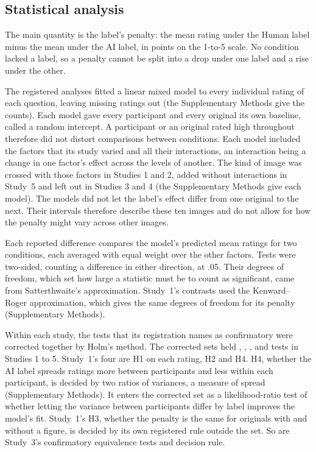 \subsection*{Statistical analysis}

The main quantity is the label's penalty: the mean rating under the Human label minus the mean under the AI label, in points on the 1-to-5 scale. No condition lacked a label, so a penalty cannot be split into a drop under one label and a rise under the other.

The registered analyses fitted a linear mixed model to every individual rating of each question, leaving missing ratings out (the Supplementary Methods give the counts). Each model gave every participant and every original its own baseline, called a random intercept. A participant or an original rated high throughout therefore did not distort comparisons between conditions. Each model included the factors that its study varied and all their interactions, an interaction being a change in one factor's effect across the levels of another. The kind of image was crossed with those factors in Studies 1 and 2, added without interactions in Study~5 and left out in Studies 3 and 4 (the Supplementary Methods give each model). The models did not let the label's effect differ from one original to the next. Their intervals therefore describe these ten images and do not allow for how the penalty might vary across other images.

Each reported difference compares the model's predicted mean ratings for two conditions, each averaged with equal weight over the other factors. Tests were two-sided, counting a difference in either direction, at .05. Their degrees of freedom, which set how large a statistic must be to count as significant, came from Satterthwaite's approximation. Study~1's contrasts used the Kenward--Roger approximation, which gives the same degrees of freedom for its penalty (Supplementary Methods).

Within each study, the tests that its registration names as confirmatory were corrected together by Holm's method.\cite{holm1979simple} The corrected sets held \SOneNConfirmatory, \STwoNConfirmatory, \SThreeNConfirmatory, \SFourNConfirmatory{} and \SFiveNConfirmatory{} tests in Studies 1 to 5. Study~1's four are H1 on each rating, H2 and H4. H4, whether the AI label spreads ratings more between participants and less within each participant, is decided by two ratios of variances, a measure of spread (Supplementary Methods). It enters the corrected set as a likelihood-ratio test of whether letting the variance between participants differ by label improves the model's fit. Study~1's H3, whether the penalty is the same for originals with and without a figure, is decided by its own registered rule outside the set. So are Study~3's confirmatory equivalence tests and decision rule.

